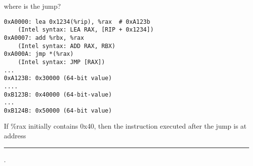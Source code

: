 \begin{frame}[fragile,label=whereIsJumpEx]{where is the jump?}
\begin{Verbatim}
0xA0000: lea 0x1234(%rip), %rax  # 0xA123b
    (Intel syntax: LEA RAX, [RIP + 0x1234])
0xA0007: add %rbx, %rax
    (Intel syntax: ADD RAX, RBX)
0xA000A: jmp *(%rax)
    (Intel syntax: JMP [RAX])
...
0xA123B: 0x30000 (64-bit value)
....
0xB123B: 0x40000 (64-bit-value)
...
0xB124B: 0x50000 (64-bit value)
\end{Verbatim}
If \%rax initially contains 0x40, then the instruction
executed after the jump is at address \rule{1cm}{1pt}.
\end{frame}
